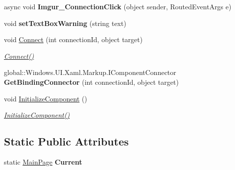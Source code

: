 \begin{DoxyCompactItemize}
\mbox{\label{classepicture_1_1_main_page_ae6731b198334f30de0431b0440f67e71}} 
async void {\bfseries Imgur\+\_\+\+Connection\+Click} (object sender, Routed\+Event\+Args e)
\item 
\mbox{\label{classepicture_1_1_main_page_a76553f8ceef4112f3c7dc55d9601e8e4}} 
void {\bfseries set\+Text\+Box\+Warning} (string text)
\item 
void \mbox{\hyperlink{classepicture_1_1_main_page_addc532a5876a946b3fa6859fedbe8eb7}{Connect}} (int connection\+Id, object target)
\begin{DoxyCompactList}\small\item\em \mbox{\hyperlink{classepicture_1_1_main_page_addc532a5876a946b3fa6859fedbe8eb7}{Connect()}} \end{DoxyCompactList}\item 
\mbox{\label{classepicture_1_1_main_page_ac478279ce6b7d7786558e1c7610bd1ac}} 
global\+::\+Windows.\+U\+I.\+Xaml.\+Markup.\+I\+Component\+Connector {\bfseries Get\+Binding\+Connector} (int connection\+Id, object target)
\item 
void \mbox{\hyperlink{classepicture_1_1_main_page_ae68560cfe8407bb0ad02d82217f93ef3}{Initialize\+Component}} ()
\begin{DoxyCompactList}\small\item\em \mbox{\hyperlink{classepicture_1_1_main_page_ae68560cfe8407bb0ad02d82217f93ef3}{Initialize\+Component()}} \end{DoxyCompactList}\end{DoxyCompactItemize}
\subsection*{Static Public Attributes}
\begin{DoxyCompactItemize}
\item 
\mbox{\label{classepicture_1_1_main_page_ab005e8d0d9e35b69547a00debd7a1cb7}} 
static \mbox{\hyperlink{classepicture_1_1_main_page}{Main\+Page}} {\bfseries Current}
\end{DoxyCompactItemize}
